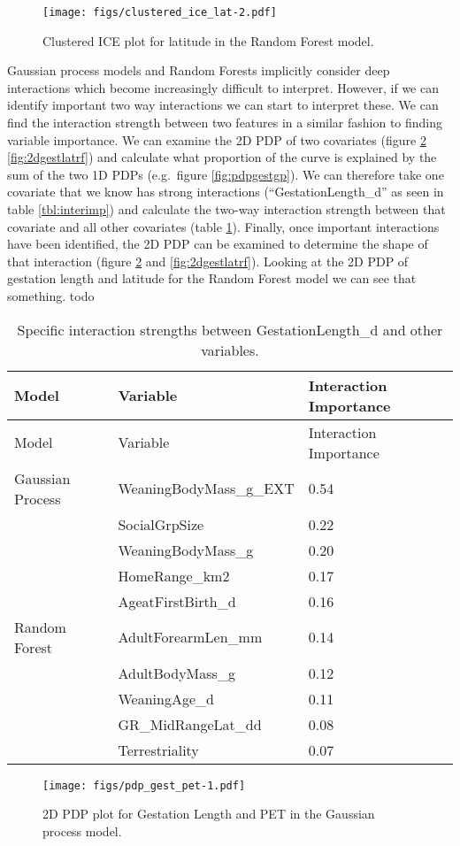 \documentclass[10pt,]{article}
\begin{document}
\begin{figure}[htbp]
\centering
\texttt{[image: figs/clustered\_ice\_lat-2.pdf]}
\caption{Clustered ICE plot for latitude in the Random Forest model.\protect\label{fig:clusticelatrf}}
\end{figure}

Gaussian process models and Random Forests implicitly consider deep interactions which become increasingly difficult to interpret. However, if we can identify important two way interactions we can start to interpret these. We can find the interaction strength between two features in a similar fashion to finding variable importance. We can examine the 2D PDP of two covariates (figure \ref{fig:2dgestlatgp} \ref{fig:2dgestlatrf}) and calculate what proportion of the curve is explained by the sum of the two 1D PDPs (e.g.~figure \ref{fig:pdpgestgp}). We can therefore take one covariate that we know has strong interactions (``GestationLength\_d'' as seen in table \ref{tbl:interimp}) and calculate the two-way interaction strength between that covariate and all other covariates (table \ref{tbl:specificinter}). Finally, once important interactions have been identified, the 2D PDP can be examined to determine the shape of that interaction (figure \ref{fig:2dgestlatgp} and \ref{fig:2dgestlatrf}). Looking at the 2D PDP of gestation length and latitude for the Random Forest model we can see that something. todo

\begin{longtable}[c]{@{}lll@{}}
\caption{Specific interaction strengths between GestationLength\_d and other variables. \label{tbl:specificinter}}\tabularnewline
\toprule
Model & Variable & Interaction Importance\tabularnewline
\midrule
\endfirsthead
\toprule
Model & Variable & Interaction Importance\tabularnewline
\midrule
\endhead
Gaussian Process & WeaningBodyMass\_g\_EXT & 0.54\tabularnewline
& SocialGrpSize & 0.22\tabularnewline
& WeaningBodyMass\_g & 0.20\tabularnewline
& HomeRange\_km2 & 0.17\tabularnewline
& AgeatFirstBirth\_d & 0.16\tabularnewline
Random Forest & AdultForearmLen\_mm & 0.14\tabularnewline
& AdultBodyMass\_g & 0.12\tabularnewline
& WeaningAge\_d & 0.11\tabularnewline
& GR\_MidRangeLat\_dd & 0.08\tabularnewline
& Terrestriality & 0.07\tabularnewline
\bottomrule
\end{longtable}

\begin{figure}[htbp]
\centering
\texttt{[image: figs/pdp\_gest\_pet-1.pdf]}
\caption{2D PDP plot for Gestation Length and PET in the Gaussian process model.\protect\label{fig:2dgestlatgp}}
\end{figure}
\end{document}
